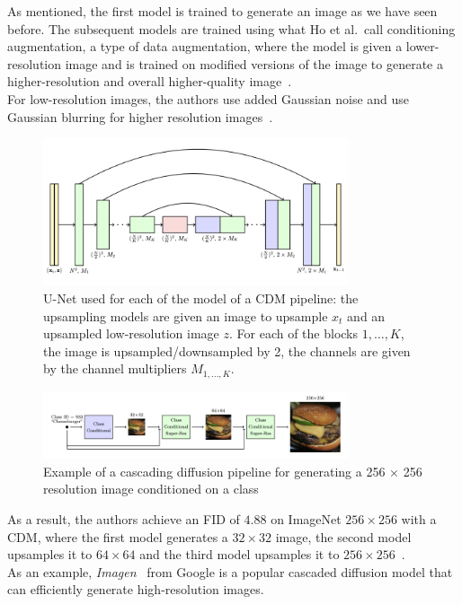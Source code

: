 \documentclass[twoside]{article}
\numberwithin{equation}{section}
\numberwithin{figure}{section}
\begin{document}
As mentioned, the first model is trained to generate an image as we have seen before. The subsequent models are trained using what Ho et al.\ call conditioning augmentation, a type of data augmentation, where the model is given a lower-resolution image and is trained on modified versions of the image to generate a higher-resolution and overall higher-quality image~\cite{ho2021cascaded}. \\
For low-resolution images, the authors use added Gaussian noise and use Gaussian blurring for higher resolution images~\cite{ho2021cascaded}.
\begin{figure}[h]
  \begin{center}
    \includegraphics[width=0.8\textwidth]{images/cascadedUnet.png}
    \caption{U-Net used for each of the model of a CDM pipeline: the upsampling models are given an image to upsample $x_t$ and an upsampled low-resolution image $z$. For each of the blocks $1, \dots, K$, the image is upsampled/downsampled by 2, the channels are given by the channel multipliers $M_{1, \dots, K}$.~\cite{ho2021cascaded}}
  \end{center}
\end{figure}
\begin{figure}[h]
  \begin{center}
    \includegraphics[width=0.8\textwidth]{images/cascading.png}
    \caption{Example of a cascading diffusion pipeline for generating a 256 $\times$ 256 resolution image conditioned on a class~\cite{ho2021cascaded}}
  \end{center}
\end{figure}

As a result, the authors achieve an FID of $4.88$ on ImageNet $256 \times 256$ with a CDM, where the first model generates a $32 \times 32$ image, the second model upsamples it to $64 \times 64$ and the third model upsamples it to $256 \times 256$~\cite{ho2021cascaded}. \\
As an example, \textit{Imagen}~\cite{saharia2022photorealistic} from Google is a popular cascaded diffusion model that can efficiently generate high-resolution images.
\end{document}
